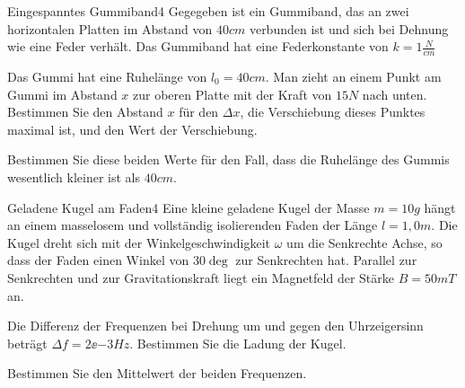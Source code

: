 


\begin{problem}{Eingespanntes Gummiband}{4}
Gegegeben ist ein Gummiband, das an zwei horizontalen Platten im Abstand von $40\unit{cm}$ verbunden ist und sich bei Dehnung wie eine Feder verhält. Das Gummiband hat eine Federkonstante von $k=1\unit{\frac{N}{cm}}$
\begin{abcenum}
  \item Das Gummi hat eine Ruhelänge von $l_0=40\unit{cm}$. Man zieht an einem Punkt am Gummi im Abstand $x$ zur oberen Platte mit der Kraft von $15\unit{N}$ nach unten. Bestimmen Sie den Abstand $x$ für den $\Delta x$, die Verschiebung dieses Punktes maximal ist, und den Wert der Verschiebung.
  \item Bestimmen Sie diese beiden Werte für den Fall, dass die Ruhelänge des Gummis wesentlich kleiner ist als $40\unit{cm}$.
\end{abcenum}
\end{problem}

\begin{problem}{Geladene Kugel am Faden}{4}
Eine kleine geladene Kugel der Masse $m=10\unit{g}$ hängt an einem masselosem und vollständig isolierenden Faden der Länge $l=1,0\unit{m}$. Die Kugel dreht sich mit der Winkelgeschwindigkeit $\omega$ um die Senkrechte Achse, so dass der Faden einen Winkel von $30\deg$ zur Senkrechten hat. Parallel zur Senkrechten und zur Gravitationskraft liegt ein Magnetfeld der Stärke $B=50\unit{mT}$ an.
\begin{abcenum}
  \item Die Differenz der Frequenzen bei Drehung um und gegen den Uhrzeigersinn beträgt $\Delta f=2\ee{-3}\unit{Hz}$. Bestimmen Sie die Ladung der Kugel.
  \item Bestimmen Sie den Mittelwert der beiden Frequenzen.
\end{abcenum}
\end{problem}

